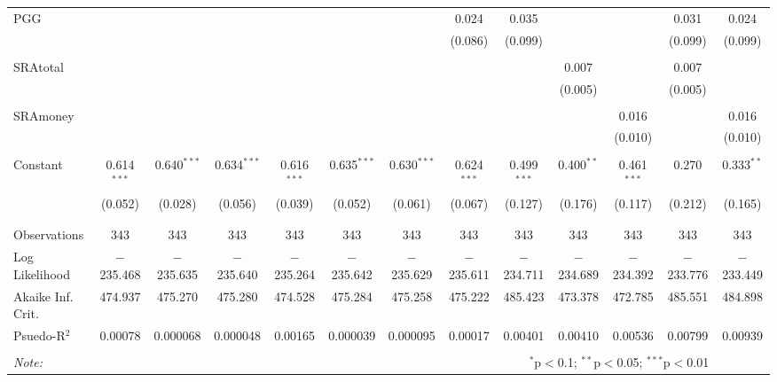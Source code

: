 \documentclass[12pt]{article}
\begin{document}
\begin{table}[!htbp]
\begin{adjustbox}{width=\textwidth}
\begin{tabular}{@{\extracolsep{5pt}}lcccccccccccc}
 PGG &  &  &  &  &  &  & 0.024 & 0.035 &  &  & 0.031 & 0.024 \\ 
  &  &  &  &  &  &  & (0.086) & (0.099) &  &  & (0.099) & (0.099) \\ 
  & & & & & & & & & & & & \\ 
 SRAtotal &  &  &  &  &  &  &  &  & 0.007 &  & 0.007 &  \\ 
  &  &  &  &  &  &  &  &  & (0.005) &  & (0.005) &  \\ 
  & & & & & & & & & & & & \\ 
 SRAmoney &  &  &  &  &  &  &  &  &  & 0.016 &  & 0.016 \\ 
  &  &  &  &  &  &  &  &  &  & (0.010) &  & (0.010) \\ 
  & & & & & & & & & & & & \\ 
 Constant & 0.614$^{***}$ & 0.640$^{***}$ & 0.634$^{***}$ & 0.616$^{***}$ & 0.635$^{***}$ & 0.630$^{***}$ & 0.624$^{***}$ & 0.499$^{***}$ & 0.400$^{**}$ & 0.461$^{***}$ & 0.270 & 0.333$^{**}$ \\ 
  & (0.052) & (0.028) & (0.056) & (0.039) & (0.052) & (0.061) & (0.067) & (0.127) & (0.176) & (0.117) & (0.212) & (0.165) \\ 
  & & & & & & & & & & & & \\ 
\hline \\[-1.8ex] 
Observations & 343 & 343 & 343 & 343 & 343 & 343 & 343 & 343 & 343 & 343 & 343 & 343 \\ 
Log Likelihood & $-$235.468 & $-$235.635 & $-$235.640 & $-$235.264 & $-$235.642 & $-$235.629 & $-$235.611 & $-$234.711 & $-$234.689 & $-$234.392 & $-$233.776 & $-$233.449 \\ 
Akaike Inf. Crit. & 474.937 & 475.270 & 475.280 & 474.528 & 475.284 & 475.258 & 475.222 & 485.423 & 473.378 & 472.785 & 485.551 & 484.898 \\ 
Psuedo-R$^{2}$ & 0.00078 & 0.000068 & 0.000048 & 0.00165 & 0.000039 & 0.000095 & 0.00017 & 0.00401 & 0.00410 & 0.00536 & 0.00799 & 0.00939 \\
\hline 
\hline \\[-1.8ex] 
\textit{Note:}  & \multicolumn{11}{r}{$^{*}$p$<$0.1; $^{**}$p$<$0.05; $^{***}$p$<$0.01} \\ 
\end{tabular} 
\end{adjustbox}
\end{table}
\end{document}
